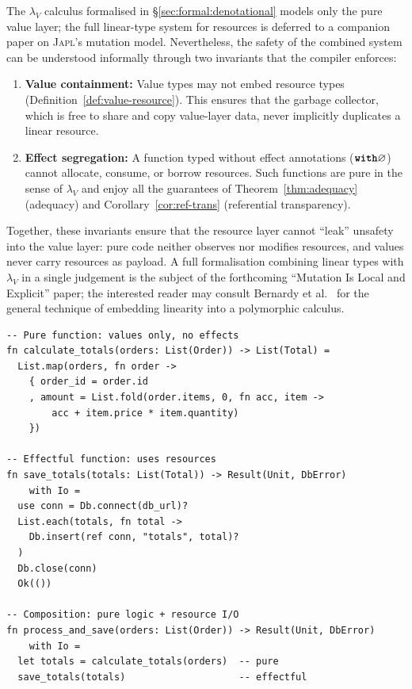 \documentclass[11pt]{article}
\theoremstyle{definition}
\theoremstyle{remark}
\newcommand{\japl}{\textsc{Japl}}
\newcommand{\keyword}[1]{\texttt{\textbf{#1}}}
\begin{document}
The $\lambda_V$ calculus formalised in \S\ref{sec:formal:denotational}
models only the pure value layer; the full linear-type system for
resources is deferred to a companion paper on \japl{}'s mutation
model.  Nevertheless, the safety of the combined system can be
understood informally through two invariants that the compiler
enforces:

\begin{enumerate}
  \item \textbf{Value containment:} Value types may not embed resource
    types (Definition~\ref{def:value-resource}).  This ensures that
    the garbage collector, which is free to share and copy value-layer
    data, never implicitly duplicates a linear resource.

  \item \textbf{Effect segregation:} A function typed without effect
    annotations ($\keyword{with} \varnothing$) cannot allocate,
    consume, or borrow resources.  Such functions are pure in the
    sense of $\lambda_V$ and enjoy all the guarantees of
    Theorem~\ref{thm:adequacy} (adequacy) and
    Corollary~\ref{cor:ref-trans} (referential transparency).
\end{enumerate}

Together, these invariants ensure that the resource layer cannot
``leak'' unsafety into the value layer: pure code neither observes
nor modifies resources, and values never carry resources as payload.
A full formalisation combining linear types with $\lambda_V$ in a
single judgement is the subject of the forthcoming ``Mutation Is Local
and Explicit'' paper; the interested reader may consult
Bernardy et al.~\cite{bernardy2018linear} for the general technique
of embedding linearity into a polymorphic calculus.

\begin{lstlisting}[caption={The dual-layer model in practice.}]
-- Pure function: values only, no effects
fn calculate_totals(orders: List(Order)) -> List(Total) =
  List.map(orders, fn order ->
    { order_id = order.id
    , amount = List.fold(order.items, 0, fn acc, item ->
        acc + item.price * item.quantity)
    })

-- Effectful function: uses resources
fn save_totals(totals: List(Total)) -> Result(Unit, DbError)
    with Io =
  use conn = Db.connect(db_url)?
  List.each(totals, fn total ->
    Db.insert(ref conn, "totals", total)?
  )
  Db.close(conn)
  Ok(())

-- Composition: pure logic + resource I/O
fn process_and_save(orders: List(Order)) -> Result(Unit, DbError)
    with Io =
  let totals = calculate_totals(orders)  -- pure
  save_totals(totals)                    -- effectful
\end{lstlisting}
\end{document}
